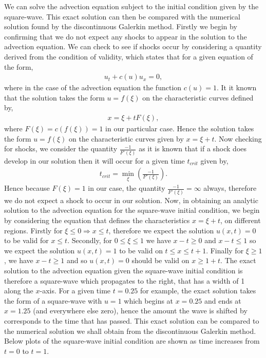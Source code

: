 \documentclass[a4paper, 12pt]{article}
\begin{document}
We can solve the advection equation subject to the initial condition given by the square-wave. This exact solution can then be compared with the numerical solution found by the discontinuous Galerkin method. Firstly we begin by confirming that we do not expect any shocks to appear in the solution to the advection equation. We can check to see if shocks occur by considering a quantity derived from the condition of validity, which states that for a given equation of the form,
\begin{align*}
u_t + c(u)u_x = 0,
\end{align*} 
where in the case of the advection equation the function $c(u)=1$. It it known that the solution takes the form $u=f(\xi)$ on the characteristic curves defined by,
\begin{align*}
x = \xi + tF(\xi),
\end{align*}
where $F(\xi)=c(f(\xi))=1$ in our particular case. Hence the solution takes the form $u=f(\xi)$ on the characteristic curves given by $x = \xi + t$. Now checking for shocks, we consider the quantity $\frac{-1}{F'(\xi)}$ as it is known that if a shock does develop in our solution then it will occur for a given time $t_{crit}$ given by,
\begin{align*}
t_{crit} = \min_{\xi} \left(\frac{-1}{F'(\xi)} \right).
\end{align*}
Hence because $F(\xi)=1$ in our case, the quantity $\frac{-1}{F'(\xi)} = \infty$ always, therefore we do not expect a shock to occur in our solution. Now, in obtaining an analytic solution to the advection equation for the square-wave initial condition, we begin by considering the equation that defines the characteristics $x=\xi +t$, on different regions. Firstly for $\xi \leq 0 \Rightarrow x \leq t$, therefore we expect the solution $u(x,t)=0$ to be valid for $x\leq t$. Secondly, for $0\leq \xi \leq1$ we have $x-t \geq 0$ and $x-t \leq 1$ so we expect the solution $u(x,t)=1$ to be valid on $t\leq x \leq t+1$. Finally for $\xi \geq 1$, we have $x-t \geq 1$ and so $u(x,t)=0$ should be valid on $x\geq 1+t $. The exact solution to the advection equation given the square-wave initial condition is therefore a square-wave which propagates to the right, that has a width of 1 along the $x$-axis. For a given time $t=0.25$ for example, the exact solution takes the form of a square-wave with $u=1$ which begins at $x=0.25$ and ends at $x=1.25$ (and everywhere else zero), hence the amount the wave is shifted by corresponds to the time that has passed. This exact solution can be compared to the numerical solution we shall obtain from the discontinuous Galerkin method. Below plots of the square-wave initial condition are shown as time increases from $t=0$ to $t=1$.\\
 
\end{document}
